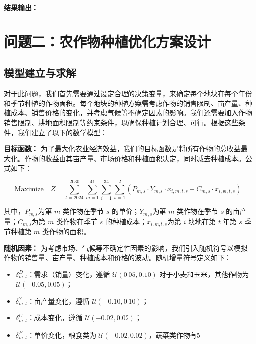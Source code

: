 \textbf{结果输出：}  


\section[\hspace{-2pt}问题二：农作物种植优化方案设计]{{\heiti{} \hspace{-8pt}问题二：农作物种植优化方案设计}}\label{section3: 问题2：农作物种植优化方案设计}

\subsection[\hspace{-2pt}模型建立与求解]{{\heiti{} \hspace{-8pt}模型建立与求解}}\label{section3: 模型建立与求解}

对于此问题，我们首先需要通过设定合理的决策变量，来确定每个地块在每个年份和季节种植的作物面积。每个地块的种植方案需考虑作物的销售限制、亩产量、种植成本、销售价格的变化，并考虑气候等不确定因素的影响。我们还需要加入作物销售限制、耕地面积限制等约束条件，以确保种植计划合理、可行。根据这些条件，我们建立了以下的数学模型：

\textbf{目标函数：}  
为了最大化农业经济效益，我们的目标函数是将所有作物的总收益最大化。作物的收益由其亩产量、市场价格和种植面积决定，同时减去种植成本。公式如下：

\begin{equation}
  \text{Maximize}\quad Z = \sum_{t=2024}^{2030} \sum_{m=1}^{41} \sum_{i=1}^{34} \sum_{s=1}^{2} \left( P_{m,s} \cdot Y_{m,s} \cdot x_{i,m,t,s} - C_{m,s} \cdot x_{i,m,t,s} \right)
\end{equation}

其中，$P_{m,s}$为第 $m$ 类作物在季节 $s$ 的单价；$Y_{m,s}$为第 $m$ 类作物在季节 $s$ 的亩产量；$C_{m,s}$为第 $m$ 类作物在季节 $s$ 的种植成本；$x_{i,m,t,s}$为第 $i$ 块地在第 $t$ 年第 $s$ 季节种植第 $m$ 类作物的面积。

\textbf{随机因素：}  
为考虑市场、气候等不确定性因素的影响，我们引入随机符号以模拟作物的销售量、亩产量、种植成本和价格的波动。随机增量符号定义如下：

\begin{itemize}
    \item $\delta^{D}_{m,t}$：需求（销量）变化，遵循 $\mathcal{U}(0.05, 0.10)$ 对于小麦和玉米，其他作物为 $\mathcal{U}(-0.05, 0.05)$；
    \item $\delta^{Y}_{m,t}$：亩产量变化，遵循 $\mathcal{U}(-0.10, 0.10)$；
    \item $\delta^{C}_{m,t}$：成本变化，遵循 $\mathcal{U}(-0.02, 0.02)$；
    \item $\delta^{P}_{m,t}$：单价变化，粮食类为 $\mathcal{U}(-0.02, 0.02)$，蔬菜类作物有5%
\end{itemize}

